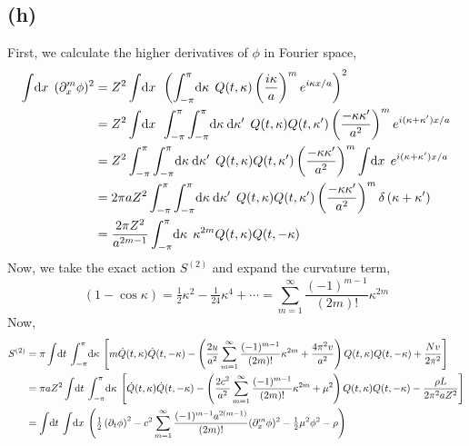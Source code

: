 \documentclass[12pt]{extarticle}
\begin{document}
\subsection*{(h)}
First, we calculate the higher derivatives of $\phi$ in Fourier space,
\begin{align*}
\int \! \d{x} \: (\partial_x^m \phi)^2 & = Z^2 \int \! \d{x} \: \left( \int_{-\pi}^{\pi} \! \d{\kappa} \: Q(t, \kappa) \left(\frac{i \kappa}{a}\right)^m e^{i \kappa x / a} \right)^2 \\
& = Z^2  \int \! \d{x} \:\int_{-\pi}^{\pi} \int_{-\pi}^{\pi} \! \d{\kappa} \d{\kappa'} \: Q(t, \kappa) Q(t, \kappa') \left(\frac{-\kappa \kappa'}{a^2} \right)^m e^{i (\kappa + \kappa') x / a} \\
& = Z^2  \int_{-\pi}^{\pi} \int_{-\pi}^{\pi} \! \d{\kappa} \d{\kappa'} \: Q(t, \kappa) Q(t, \kappa') \left(\frac{-\kappa \kappa'}{a^2} \right)^m \int \! \d{x} \: e^{i (\kappa + \kappa') x / a} \\
& = 2 \pi a Z^2  \int_{-\pi}^{\pi} \int_{-\pi}^{\pi} \! \d{\kappa} \d{\kappa'} \: Q(t, \kappa) Q(t, \kappa') \left(\frac{-\kappa \kappa'}{a^2} \right)^m \delta\left( \kappa + \kappa' \right) 
\\ & = \frac{2 \pi Z^2}{a^{2m - 1}}  \int_{-\pi}^{\pi} \! \d{\kappa} \: \kappa^{2m} Q(t, \kappa) Q(t, -\kappa) 
\end{align*}
Now, we take the exact action $S^{(2)}$ and expand the curvature term,
\[(1 - \cos{\kappa}) = \tfrac{1}{2} \kappa^2 - \tfrac{1}{24} \kappa^4 + \cdots = \sum_{m = 1}^\infty \frac{(-1)^{m - 1}}{(2m)!} \kappa^{2m} \]  
Now,
\begin{align*}
S^{(2)} & = \pi \int \! \mathrm{d}t \: \int_{-\pi}^{\pi} \! \mathrm{d}\kappa \: \left[m \dot{Q}(t, \kappa) \dot{Q}(t, -\kappa) - \left( \frac{2u}{a^2} \sum_{m = 1}^\infty \frac{(-1)^{m - 1} }{(2m)!} \kappa^{2m} + \frac{4 \pi^2 v}{a^2} \right) Q(t, \kappa) Q(t, -\kappa) + \frac{N v}{2 \pi^2} \right] \\
& = \pi a Z^2 \int \! \mathrm{d}t \: \int_{-\pi}^{\pi} \! \mathrm{d}\kappa \: \left[\dot{Q}(t, \kappa) \dot{Q}(t, -\kappa) - \left( \frac{2 c^2}{a^2} \sum_{m = 1}^\infty \frac{(-1)^{m - 1}}{(2m)!} \kappa^{2m} + \mu^2 \right) Q(t, \kappa) Q(t, -\kappa) - \frac{\rho L}{2 \pi^2 a Z^2} \right] \\
& = \int \! \mathrm{d}t \: \int \! \mathrm{d}x \: \left( \tfrac{1}{2} \left( \partial_t \phi \right)^2  -  c^2 \sum_{m = 1}^{\infty} \frac{(-1)^{m - 1}a^{2(m-1)}}{(2m)!} (\partial_x^m \phi)^2 - \tfrac{1}{2} \mu^2 \phi^2 - \rho \right)
\end{align*}
\end{document}
